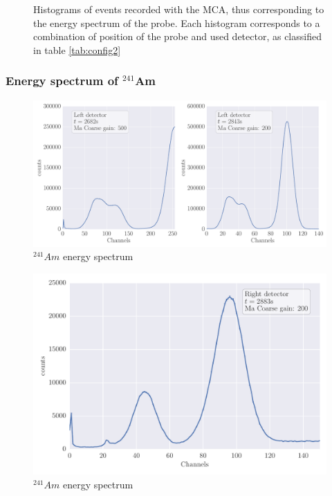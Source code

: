 \begin{figure}[H]
\begin{subfigure}[b]{\picwidth}
        \caption{}
    \end{subfigure}
    \caption{
        Histograms of events recorded with the MCA, thus corresponding to the energy 
        spectrum of the probe. Each histogram corresponds to a combination of position 
        of the probe and used detector, as classified in table \ref{tab:config2}
        }
    \label{fig:measure2.1}
\end{figure}

\subsubsection{Energy spectrum of $^{241}$Am}
\begin{figure}[H]
    \centering
    \includegraphics[width=\linewidth]{analysis/figures/plot6_12}
    \caption{$^{241}Am$ energy spectrum}
    \label{fig:plot6_13}
\end{figure}
\begin{figure}[H]
    \centering
    \includegraphics[width=0.8\linewidth]{analysis/figures/plot6_3}
    \caption{$^{241}Am$ energy spectrum}
    \label{fig:plot6_13}
\end{figure}
\clearpage

